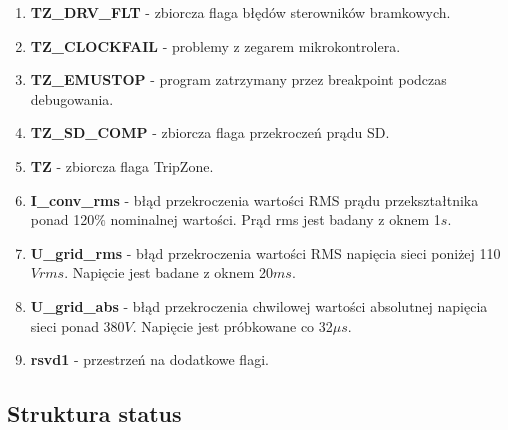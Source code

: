 \documentclass[12pt,a4paper]{article}
\begin{document}
\begin{enumerate}
	\item \textbf{TZ\_DRV\_FLT} - zbiorcza flaga błędów sterowników bramkowych.
	
	\item \textbf{TZ\_CLOCKFAIL} - problemy z zegarem mikrokontrolera.
	
	\item \textbf{TZ\_EMUSTOP} - program zatrzymany przez breakpoint podczas debugowania.
	
	\item \textbf{TZ\_SD\_COMP} - zbiorcza flaga przekroczeń prądu SD.

	\item \textbf{TZ} - zbiorcza flaga TripZone.

	\item \textbf{I\_conv\_rms} - błąd przekroczenia wartości RMS prądu przekształtnika ponad 120$\%$ nominalnej wartości. Prąd rms jest badany z oknem 1$s$.

	\item \textbf{U\_grid\_rms} - błąd przekroczenia wartości RMS napięcia sieci poniżej 110$Vrms$. Napięcie jest badane z oknem 20$ms$.

	\item \textbf{U\_grid\_abs} - błąd przekroczenia chwilowej wartości absolutnej napięcia sieci ponad 380$V$. Napięcie jest próbkowane co 32$\mu s$.

	\item \textbf{rsvd1} - przestrzeń na dodatkowe flagi.
\end{enumerate}

\subsection{Struktura status}


\end{document}
